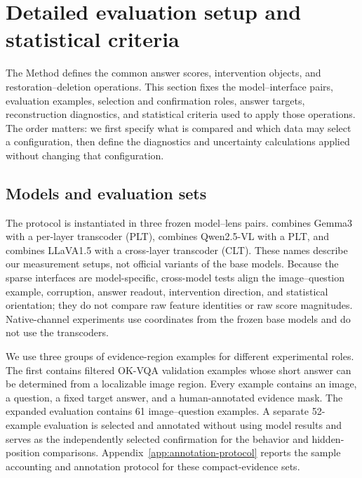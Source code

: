 \section{Detailed evaluation setup and statistical criteria}
\label{app:detailed-setup}

The Method defines the common answer scores, intervention objects, and restoration--deletion operations. This section fixes the model--interface pairs, evaluation examples, selection and confirmation roles, answer targets, reconstruction diagnostics, and statistical criteria used to apply those operations. The order matters: we first specify what is compared and which data may select a configuration, then define the diagnostics and uncertainty calculations applied without changing that configuration.

\subsection{Models and evaluation sets}

The protocol is instantiated in three frozen model--lens pairs. \textbf{\modelgemma{}} combines Gemma3 \citep{gemma3} with a per-layer transcoder (PLT), \textbf{\modelqwen{}} combines Qwen2.5-VL \citep{qwen25vl} with a PLT, and \textbf{\modelllava{}} combines LLaVA1.5 \citep{llava} with a cross-layer transcoder (CLT). These names describe our measurement setups, not official variants of the base models. Because the sparse interfaces are model-specific, cross-model tests align the image--question example, corruption, answer readout, intervention direction, and statistical orientation; they do not compare raw feature identities or raw score magnitudes. Native-channel experiments use coordinates from the frozen base models and do not use the transcoders.

We use three groups of evidence-region examples for different experimental roles. The first contains filtered OK-VQA validation examples \citep{okvqa} whose short answer can be determined from a localizable image region. Every example contains an image, a question, a fixed target answer, and a human-annotated evidence mask. The expanded evaluation contains 61 image--question examples. A separate 52-example evaluation is selected and annotated without using model results and serves as the independently selected confirmation for the behavior and hidden-position comparisons. Appendix~\ref{app:annotation-protocol} reports the sample accounting and annotation protocol for these compact-evidence sets.


